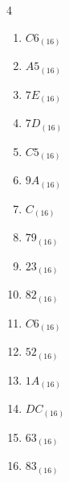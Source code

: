 \begin{multicols}{4}
\begin{enumerate}
  \item $C6_{(16)}$

        \phantom{$=198$}

  \item $A5_{(16)}$

        \phantom{$=165$}

  \item $7E_{(16)}$

        \phantom{$=126$}

  \item $7D_{(16)}$

        \phantom{$=125$}

  \item $C5_{(16)}$

        \phantom{$=197$}

  \item $9A_{(16)}$

        \phantom{$=154$}

  \item $C_{(16)}$

        \phantom{$=12$}

\columnbreak %

  \item $79_{(16)}$

        \phantom{$=121$}

  \item $23_{(16)}$

        \phantom{$=35$}

  \item $82_{(16)}$

        \phantom{$=130$}

  \item $C6_{(16)}$

        \phantom{$=198$}

  \item $52_{(16)}$

        \phantom{$=82$}

  \item $1A_{(16)}$

        \phantom{$=26$}

  \item $DC_{(16)}$

        \phantom{$=220$}

  \item $63_{(16)}$

        \phantom{$=99$}

  \item $83_{(16)}$


\end{enumerate}
\end{multicols}

